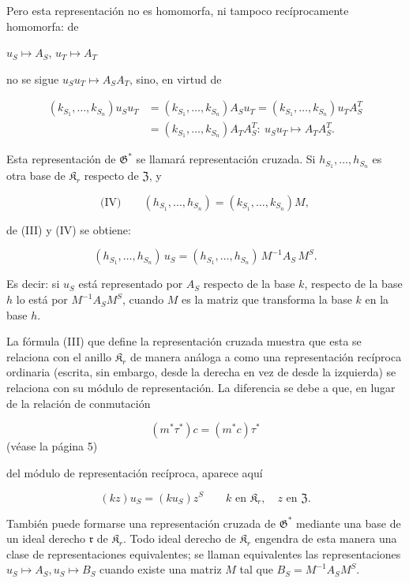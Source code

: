 Pero esta representación no es homomorfa, ni tampoco recíprocamente homomorfa: de

\(u_S \mapsto A_S\), \(u_T \mapsto A_T\)

no se sigue \(u_Su_T \mapsto A_SA_T\), sino, en virtud de

\[
\begin{aligned}
(k_{S_1}, \ldots, k_{S_n})u_Su_T
&=(k_{S_1}, \ldots, k_{S_n})A_Su_T
=(k_{S_1}, \ldots, k_{S_n})u_TA_S^T\\
&=(k_{S_1}, \ldots, k_{S_n})A_TA_S^T:\ u_Su_T\mapsto A_TA_S^T.
\end{aligned}
\]

Esta representación de \(\mathfrak G^*\) se llamará representación cruzada. Si \(h_{S_1}, \ldots, h_{S_n}\) es otra base de \(\mathfrak K_r\) respecto de \(\mathfrak Z\), y

\[
\text{(IV)}\qquad (h_{S_1}, \ldots, h_{S_n}) = (k_{S_1}, \ldots, k_{S_n})M,
\]

de (III) y (IV) se obtiene:

\[(h_{S_1},\ldots,h_{S_n})\,u_S=(h_{S_1},\ldots,h_{S_n})\,M^{-1}A_S\,M^S.\]

Es decir: si \(u_S\) está representado por \(A_S\) respecto de la base \(k\), respecto de la base \(h\) lo está por \(M^{-1}A_SM^S\), cuando \(M\) es la matriz que transforma la base \(k\) en la base \(h\).

La fórmula (III) que define la representación cruzada muestra que esta se relaciona con el anillo \(\mathfrak K_r\) de manera análoga a como una representación recíproca ordinaria (escrita, sin embargo, desde la derecha en vez de desde la izquierda) se relaciona con su módulo de representación. La diferencia se debe a que, en lugar de la relación de conmutación

\[(m^*\tau^*)c = (m^*c)\tau^*\]
(véase la página 5)

del módulo de representación recíproca, aparece aquí

\[
(kz)u_S=(ku_S)z^S\qquad k\text{ en }\mathfrak K_r,\quad z\text{ en }\mathfrak Z.
\]

También puede formarse una representación cruzada de \(\mathfrak G^*\) mediante una base de un ideal derecho \(\mathfrak r\) de \(\mathfrak K_r\). Todo ideal derecho de \(\mathfrak K_r\) engendra de esta manera una clase de representaciones equivalentes; se llaman equivalentes las representaciones \(u_S \mapsto A_S, u_S \mapsto B_S\) cuando existe una matriz \(M\) tal que \(B_S = M^{-1}A_SM^S\).

